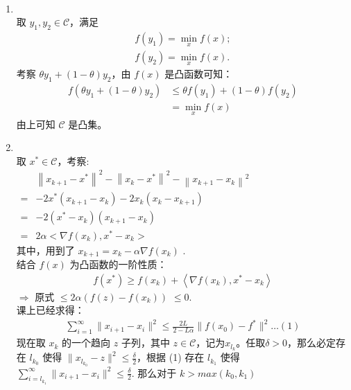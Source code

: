 \documentclass[11pt,letter,notitlepage]{article}
\begin{document}
\begin{solution}
    \ \\
    \heiti
    \begin{enumerate}
        \item \ \\
        取 $y_1, y_2 \in \mathcal{C}$，满足
        \begin{align*}
            f(y_1) = \min_{x}f(x);\\
            f(y_2) = \min_{x}f(x).
        \end{align*}
        考察 $\theta y_1 + (1-\theta) y_2$，由 $f(x)$ 是凸函数可知：
        \begin{align*}
            f(\theta y_1+(1-\theta) y_2) &\leq \theta f(y_1) + (1 - \theta) f(y_2) \\
            & = \min_{x}f(x)
        \end{align*}
        由上可知 $\mathcal{C}$ 是凸集。
    \item \ \\
        取 $x^* \in \mathcal{C}$，考察:\\
        $\begin{aligned} &\left\|x_{k+1}-x^*\right\|^{2}-\left\|x_{k}-x^*\right\|^{2}-\left\|x_{k+1}-x_{k}\right\|^{2} \\=&-2 x^*\left(x_{k+1}-x_{k}\right)-2 x_{k}\left(x_{k}-x_{k+1}\right) \\=&-2\left(x^*-x_{k}\right)\left(x_{k+1}-x_{k}\right) \\=& 2 \alpha<\nabla f\left(x_{k}\right), x^*-x_{k}>\end{aligned}$ \\
        其中，用到了 $x_{k+1} = x_k - \alpha \nabla f(x_k)$ . \\
        结合 $f(x)$ 为凸函数的一阶性质：\\
        \begin{align*}
            f(x^*) \geqslant f\left(x_{k}\right)+\left\langle\nabla f\left(x_{k}\right), x^*-x_{k}\right\rangle
        \end{align*}
        $\Rightarrow$ 原式
        $\leq 2 \alpha\left(f(z)-f\left(x_{k}\right)\right)$
        $\leqslant 0$.\\
        课上已经求得：
        \begin{align*}
            \sum\limits_{i=1}^{\infty} \| x_{i+1} - x_{i} \| ^2 \leq \frac{2L}{2-L\alpha} \| f(x_0) - f^*\|^2   \dots (1)
        \end{align*}
        现在取 ${x_k}$ 的一个趋向 $z$ 子列，其中 $z \in \mathcal{C}$，记为${x_{l_k}}$。任取$\delta > 0$，那么必定存在 $l_{k_0}$ 使得 $\| x_{l_{k_0}} - z \|^2 \leq \frac{\delta}{2}$，根据 (1) 存在 $l_{k_1}$ 使得 $\sum\limits_{i=l_{k_1}}^{\infty} \| x_{i+1} - x_{i} \| ^2 \leq \frac{\delta}{2}$. 那么对于 $k > max(k_0, k_1)$ \\

\end{enumerate}
\end{solution}
\end{document}
